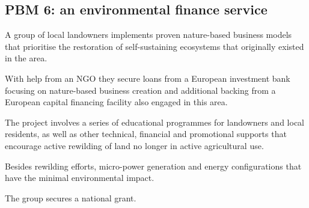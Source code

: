 \subsection{PBM 6: an environmental finance service}

A group of local landowners implements proven nature-based business models that
prioritise the restoration of self-sustaining ecosystems that originally
existed in the area.

With help from an NGO they secure loans from a European investment bank
focusing on nature-based business creation and additional backing from a
European capital financing facility also engaged in this area.

The project involves a series of educational programmes for landowners and
local residents, as well as other technical, financial and promotional supports
that encourage active rewilding of land no longer in active agricultural use.

Besides rewilding efforts, micro-power generation and energy configurations
that have the minimal environmental impact.

The group secures a national grant.
